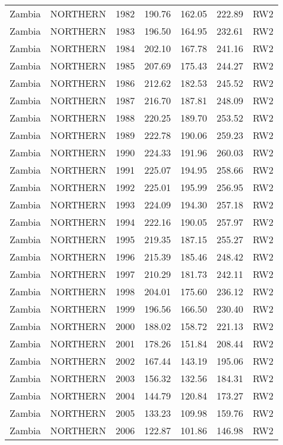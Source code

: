 \begin{longtable}{lllrrrl}
  Zambia & NORTHERN & 1982 & 190.76 & 162.05 & 222.89 & RW2 \\ 
  Zambia & NORTHERN & 1983 & 196.50 & 164.95 & 232.61 & RW2 \\ 
  Zambia & NORTHERN & 1984 & 202.10 & 167.78 & 241.16 & RW2 \\ 
  Zambia & NORTHERN & 1985 & 207.69 & 175.43 & 244.27 & RW2 \\ 
  Zambia & NORTHERN & 1986 & 212.62 & 182.53 & 245.52 & RW2 \\ 
  Zambia & NORTHERN & 1987 & 216.70 & 187.81 & 248.09 & RW2 \\ 
  Zambia & NORTHERN & 1988 & 220.25 & 189.70 & 253.52 & RW2 \\ 
  Zambia & NORTHERN & 1989 & 222.78 & 190.06 & 259.23 & RW2 \\ 
  Zambia & NORTHERN & 1990 & 224.33 & 191.96 & 260.03 & RW2 \\ 
  Zambia & NORTHERN & 1991 & 225.07 & 194.95 & 258.66 & RW2 \\ 
  Zambia & NORTHERN & 1992 & 225.01 & 195.99 & 256.95 & RW2 \\ 
  Zambia & NORTHERN & 1993 & 224.09 & 194.30 & 257.18 & RW2 \\ 
  Zambia & NORTHERN & 1994 & 222.16 & 190.05 & 257.97 & RW2 \\ 
  Zambia & NORTHERN & 1995 & 219.35 & 187.15 & 255.27 & RW2 \\ 
  Zambia & NORTHERN & 1996 & 215.39 & 185.46 & 248.42 & RW2 \\ 
  Zambia & NORTHERN & 1997 & 210.29 & 181.73 & 242.11 & RW2 \\ 
  Zambia & NORTHERN & 1998 & 204.01 & 175.60 & 236.12 & RW2 \\ 
  Zambia & NORTHERN & 1999 & 196.56 & 166.50 & 230.40 & RW2 \\ 
  Zambia & NORTHERN & 2000 & 188.02 & 158.72 & 221.13 & RW2 \\ 
  Zambia & NORTHERN & 2001 & 178.26 & 151.84 & 208.44 & RW2 \\ 
  Zambia & NORTHERN & 2002 & 167.44 & 143.19 & 195.06 & RW2 \\ 
  Zambia & NORTHERN & 2003 & 156.32 & 132.56 & 184.31 & RW2 \\ 
  Zambia & NORTHERN & 2004 & 144.79 & 120.84 & 173.27 & RW2 \\ 
  Zambia & NORTHERN & 2005 & 133.23 & 109.98 & 159.76 & RW2 \\ 
  Zambia & NORTHERN & 2006 & 122.87 & 101.86 & 146.98 & RW2 \\ 

\end{longtable}
